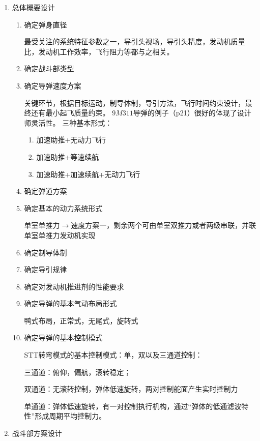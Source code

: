 \begin{enumerate}[1.]
\item 总体概要设计
    \begin{enumerate}[i]
        \item 确定弹身直径
        
        {\kaishu 最受关注的系统特征参数之一，导引头视场，导引头精度，发动机质量比，发动机工作效率，飞行阻力等都与之相关。}
        \item 确定战斗部类型
        \item 确定导弹速度方案
        
        {\kaishu 关键环节，根据目标运动，制导体制，导引方法，飞行时间约束设计，最终还有最小起飞质量约束。
        $9M311$导弹的例子（p21）很好的体现了设计师灵活性。
            三种基本形式：
                \begin{enumerate}[a]
                    \item 加速助推+无动力飞行
                    \item 加速助推+等速续航
                    \item 加速助推+加速续航+无动力飞行
                \end{enumerate}
        }
        \item 确定弹道方案
        \item 确定基本的动力系统形式
        
        {\kaishu 单室单推力$\rightarrow$速度方案一，剩余两个可由单室双推力或者两级串联，并联单室单推力发动机实现}
        \item 确定制导体制
        \item 确定导引规律
        \item 确定对发动机推进剂的性能要求
        \item 确定导弹的基本气动布局形式
        
        {\kaishu 鸭式布局，正常式，无尾式，旋转式}
        \item 确定导弹的基本控制模式
        
        {\kaishu STT转弯模式的基本控制模式：单，双以及三通道控制：
        
        三通道：俯仰，偏航，滚转稳定；
        
        双通道：无滚转控制，弹体低速旋转，两对控制舵面产生实时控制力
        
        单通道：弹体低速旋转，有一对控制执行机构，通过“弹体的低通滤波特性”形成周期平均控制力。
        }
    \end{enumerate}
\item 战斗部方案设计


\end{enumerate}
